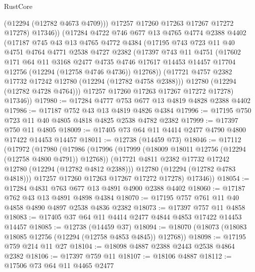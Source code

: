 \begin{lexlean}{RustCore}
\begin{coremodule}
              (@12294 (@12782 @4673 @4709)))
            @17257
            @17260
            @17263
            @17267
            @17272
            @17278)
          @17346))
      (@17284
        @4722
        @746
        @677
        @13
        @4765
        @4774
        @2388
        @4402
        (@17187
          @745
          @43
          @13
          @4765
          @4772
          @4384
          (@17195
            @743
            @723
            @11
            @40
            @4751
            @4764
            @4771
            @2538
            @4727
            @2382
            (@17397
              @743
              @11
              @4751
              (@17602
                @171
                @64
                @11
                @3168
                @2477
                @4735
                @4746
                @17617
                @14453
                @14457
                @17704
                @12756
                (@12294 (@12758 @4746 @4736))
                @12768))
            (@17721 @4757 @2382 @17732 @17242 @12780 (@12294 (@12782 @4758 @2388)))
            @12780
            (@12294 (@12782 @4728 @4764)))
          @17257
          @17260
          @17263
          @17267
          @17272
          @17278)
        @17346))
@17980 := @17284 @4777 @753 @677 @13 @4819 @4828 @2388 @4402
@17986 := @17187 @752 @43 @13 @4819 @4826 @4384
@17996 := @17195 @750 @723 @11 @40 @4805 @4818 @4825 @2538 @4782 @2382
@17999 := @17397 @750 @11 @4805
@18009 := @17405 @73 @64 @11 @4414 @2477 @4790 @4800 @17422 @14453 @14457
@18011 := @12738 (@14459 @73)
@18046 := @17112
    (@17972
      (@17980
        (@17986
          (@17996
            (@17999 (@18009 @18011 @12756 (@12294 (@12758 @4800 @4791)) @12768))
            (@17721 @4811 @2382 @17732 @17242 @12780 (@12294 (@12782 @4812 @2388)))
            @12780
            (@12294 (@12782 @4783 @4818)))
          @17257
          @17260
          @17263
          @17267
          @17272
          @17278)
        @17346))
@18054 := @17284 @4831 @763 @677 @13 @4891 @4900 @2388 @4402
@18060 := @17187 @762 @43 @13 @4891 @4898 @4384
@18070 := @17195 @757 @761 @11 @40 @4858 @4890 @4897 @2538 @4836 @2382
@18073 := @17397 @757 @11 @4858
@18083 := @17405 @37 @64 @11 @4414 @2477 @4844 @4853 @17422 @14453 @14457
@18085 := @12738 (@14459 @37)
@18094 := @18070 (@18073 (@18083 @18085 @12756 (@12294 (@12758 @4853 @4845)) @12768))
@18098 := @17195 @759 @214 @11 @27
@18104 := @18098 @4887 @2388 @2443 @2538 @4864 @2382
@18106 := @17397 @759 @11
@18107 := @18106 @4887
@18112 := @17506 @73 @64 @11 @4465 @2477

\end{coremodule}
\end{lexlean}
